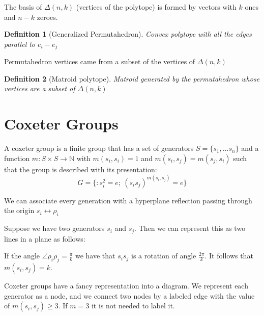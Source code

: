 \documentclass{myclass}
\newtheorem*{definition}{Definition}
\begin{document}
The basis of $\Delta(n,k)$ (vertices of the polytope) is formed by vectors with $k$ ones and  $n-k$ zeroes.

\begin{definition}[Generalized Permutahedron] Convex polytope with all the edges parallel to $e_i-e_j$
\end{definition}

Permutahedron vertices came from a subset of the vertices of $\Delta(n, k)$

 \begin{definition}[Matroid polytope] Matroid generated by the permutahedron whose vertices are a subset of $\Delta(n,k)$



\end{definition}




\section{Coxeter Groups}
A coxeter group is a finite group that has a set of generators $S=\{s_1, \ldots s_n\}$ and a function $m:S\times S \to \mathbb{N}$ with $m(s_i, s_i)=1$ and $m(s_i, s_j)=m(s_j, s_i)$ such that the group is described with its presentation:
 \[
G = \{ : s_i^2 = e; \  (s_is_j)^{m(s_i, s_j)}=e\}
\] 

We can associate every generation with a hyperplane reflection passing through the origin $s_i \leftrightarrow \rho_i$

Suppose we have two generators $s_i$ and  $s_j$. Then we can represent this as two lines in a plane as follows:

If the angle $\angle \rho_i \rho _j = \frac{\pi}{k}$ we have that $s_is_j$ is a rotation of angle $\frac{2\pi}{k}$. It follows that $m(s_i, s_j)=k$.

Coxeter groups have a fancy representation into a diagram. We represent each generator as a node, and we connect two nodes by a labeled edge with the value of $m(s_i, s_j)\ge 3$. If $m=3$ it is not needed to label it. 

\begin{center}
\end{center}
\end{document}
